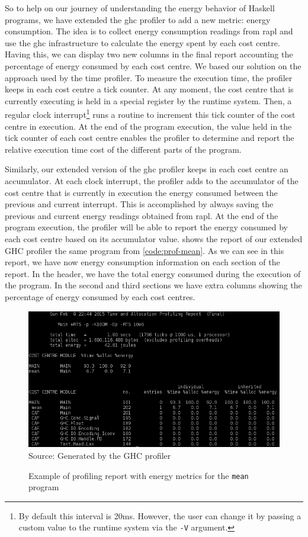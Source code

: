 So to help on our journey of understanding the energy behavior of Haskell programs, we have extended the \ac{ghc} profiler to add a new metric: energy consumption. The idea is to collect energy consumption readings from \ac{rapl} and use the \ac{ghc} infrastructure to calculate the energy spent by each cost centre. Having this, we can display two new columns in the final report accounting the percentage of energy consumed by each cost centre. We based our solution on the approach used by the time profiler. To measure the execution time, the profiler keeps in each cost centre a tick counter. At any moment, the cost centre that is currently executing is held in a special register by the runtime system. Then, a regular clock interrupt\footnote{By default this interval is 20ms. However, the user can change it by passing a custom value to the runtime system via the \texttt{-V} argument.} runs a routine to increment this tick counter of the cost centre in execution. At the end of the program execution, the value held in the tick counter of each cost centre enables the profiler to determine and report the relative execution time cost of the different parts of the program.

Similarly, our extended version of the \ac{ghc} profiler keeps in each cost centre an accumulator. At each clock interrupt, the profiler adds to the accumulator of the cost centre that is currently in execution the energy consumed between the previous and current interrupt. This is accomplished by always saving the previous and current energy readings obtained from \ac{rapl}. At the end of the program execution, the profiler will be able to report the energy consumed by each cost centre based on its accumulator value.  shows the report of our extended GHC profiler the same program from \autoref{code:prof-mean}. As we can see in this report, we have now energy consumption information on each section of the report. In the header, we have the total energy consumed during the execution of the program. In the second and third sections we have extra columns showing the percentage of energy consumed by each cost centres.

\begin{figure}[htp]
  \centering
  \caption{Example of profiling report with energy metrics for the \texttt{mean} program}
  \includegraphics[width=\columnwidth]{images/energy-profiler-placeholder}
  \footnotesize{Source: Generated by the GHC profiler}
  \label{fig:energy-prof-report}
\end{figure}

